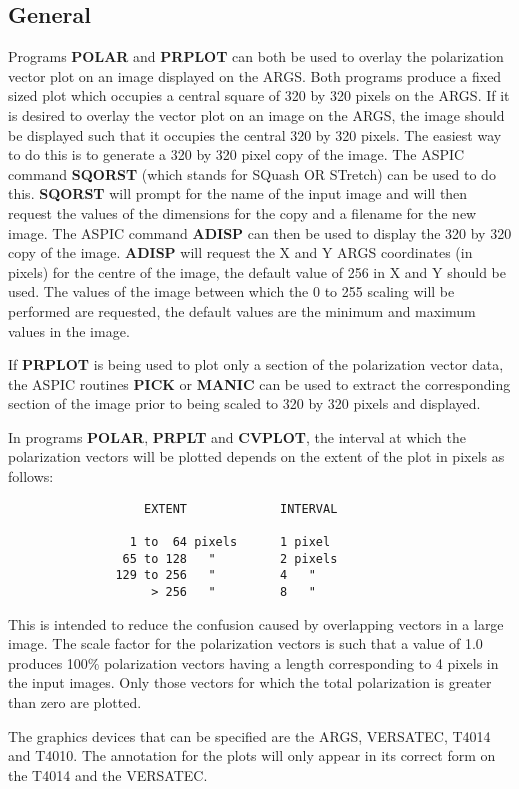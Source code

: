 \subsection {General}
Programs {\bf POLAR} and {\bf PRPLOT} can both be used to overlay the
polarization vector plot on an image displayed on the ARGS.
Both programs produce a fixed sized plot which occupies a central square of
320 by 320 pixels on the ARGS.
If it is desired to overlay the vector plot on an image on the ARGS, the image
should be displayed such that it occupies the central 320 by 320 pixels.
The easiest way to do this is to generate a 320 by 320 pixel copy of the image.
The ASPIC command {\bf SQORST} (which stands for SQuash OR STretch) can be used
to do this.
{\bf SQORST} will prompt for the name of the input image and will then request
the values of the dimensions for the copy and a filename for the new image.
The ASPIC command {\bf ADISP} can then be used to display the 320 by 320 copy of
the image.
{\bf ADISP} will request the X and Y ARGS coordinates (in pixels) for the
centre of the image, the default value of 256 in X and Y should be used.
The values of the image between which the 0 to 255 scaling will be performed are
requested, the default values are the minimum and maximum values in the image.

If {\bf PRPLOT} is being used to plot only a section of the polarization vector
data, the ASPIC routines {\bf PICK} or {\bf MANIC} can be used to extract the
corresponding section of the image prior to being scaled to 320 by 320 pixels
and displayed.

In programs {\bf POLAR}, {\bf PRPLT} and {\bf CVPLOT}, the interval at which
the polarization vectors will be plotted depends on the extent of the plot in
pixels as follows:
\begin{verbatim}
                   EXTENT             INTERVAL

                 1 to  64 pixels      1 pixel
                65 to 128   "         2 pixels
               129 to 256   "         4   "
                    > 256   "         8   "
\end{verbatim}
This is intended to reduce the confusion caused by overlapping vectors in a
large image.
The scale factor for the polarization vectors is such that a value of 1.0
produces 100\% polarization vectors having a length corresponding to 4 pixels in
the input images.
Only those vectors for which the total polarization is greater than zero are
plotted.

The graphics devices that can be specified are the ARGS, VERSATEC, T4014 and
T4010.
The annotation for the plots will only appear in its correct form on the T4014
and the VERSATEC.
